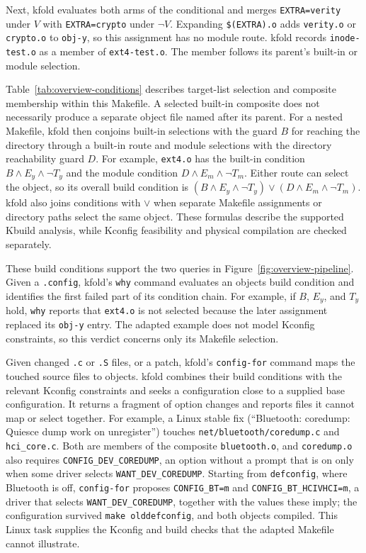 \documentclass[acmsmall]{acmart}
\newcommand{\tool}{\textsf{kfold}\xspace}
\begin{document}
Next, \tool evaluates both arms of the conditional and merges \texttt{EXTRA=verity} under $V$ with \texttt{EXTRA=crypto} under $\neg V$.
Expanding \texttt{\$(EXTRA).o} adds \texttt{verity.o} or \texttt{crypto.o} to \texttt{obj-y}, so this assignment has no module route.
\tool records \texttt{inode-test.o} as a member of \texttt{ext4-test.o}.
The member follows its parent's built-in or module selection.

Table~\ref{tab:overview-conditions} describes target-list selection and composite membership within this Makefile.
A selected built-in composite does not necessarily produce a separate object file named after its parent.
For a nested Makefile, \tool then conjoins built-in selections with the guard $B$ for reaching the directory through a built-in route and module selections with the directory reachability guard $D$.
For example, \texttt{ext4.o} has the built-in condition $B\land E_y\land\neg T_y$ and the module condition $D\land E_m\land\neg T_m$.
Either route can select the object, so its overall build condition is $(B\land E_y\land\neg T_y)\lor(D\land E_m\land\neg T_m)$.
\tool also joins conditions with $\lor$ when separate Makefile assignments or directory paths select the same object.
These formulas describe the supported Kbuild analysis, while Kconfig feasibility and physical compilation are checked separately.

These build conditions support the two queries in Figure~\ref{fig:overview-pipeline}.
Given a \texttt{.config}, \tool's \texttt{why} command evaluates an object\textquotesingle s build condition and identifies the first failed part of its condition chain.
For example, if $B$, $E_y$, and $T_y$ hold, \texttt{why} reports that \texttt{ext4.o} is not selected because the later assignment replaced its \texttt{obj-y} entry.
The adapted example does not model Kconfig constraints, so this verdict concerns only its Makefile selection.



Given changed \texttt{.c} or \texttt{.S} files, or a patch, \tool's \texttt{config-for} command maps the touched source files to objects.
\tool combines their build conditions with the relevant Kconfig constraints and seeks a configuration close to a supplied base configuration.
It returns a fragment of option changes and reports files it cannot map or select together.
For example, a Linux \NLinuxVersion stable fix (``Bluetooth: coredump: Quiesce dump work on unregister'') touches \texttt{net/bluetooth/coredump.c} and \texttt{hci\_core.c}.
Both are members of the composite \texttt{bluetooth.o}, and \texttt{coredump.o} also requires \texttt{CONFIG\_DEV\_COREDUMP}, an option without a prompt that is on only when some driver selects \texttt{WANT\_DEV\_COREDUMP}.
Starting from \texttt{defconfig}, where Bluetooth is off, \texttt{config-for} proposes \texttt{CONFIG\_BT=m} and \texttt{CONFIG\_BT\_HCIVHCI=m}, a driver that selects \texttt{WANT\_DEV\_COREDUMP}, together with the values these imply; the configuration survived \texttt{make olddefconfig}, and both objects compiled.
This Linux task supplies the Kconfig and build checks that the adapted Makefile cannot illustrate.
\end{document}
